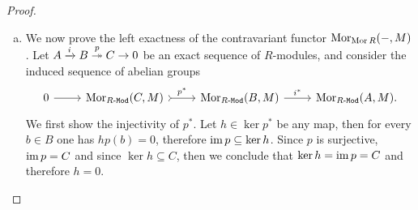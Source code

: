 \begin{proof}
\begin{enumerate}[(a)]
              For the converse of this inclusion, let \(h \in \ker g_{*}\) be any map so
              that \(g h(m) = 0\) for all \(m \in M\)---therefore \(h(m) \in \ker g\) and by
              exactness this means that there must exist \(a \in A\) such that \(f(a) = m\),
              which is unique since \(f\) is an injective map. Define \(p: M \to A\) by
              mapping \(m \mapsto a\) if \(h(m) = f(a)\). To check that \(p\) is a morphism
              of modules, let \(m, m' \in M\) be elements and let \(a, a' \in A\) be such
              that \(h(m) = f(a)\) and \(h(m') = f(a')\). Then since
              \[
                  h(m + m') = h(m) + h(m') = f(a) + f(a') = f(a + a'),
              \]
              then \(p(m + m') = a + a' = p(m) + p(m')\). If \(r \in R\) is any ring
              element, then one also has
              \[
                  h(m r) = h(m) r = f(a) r = f(a r),
              \]
              therefore \(p(m r) = a r = p(m) r\). Then we conclude that \(p \in
              \Hom_{\Mor{R}}(M, A)\) and therefore \(f_{*}(p) = h\), showing that \(h \in
              \im f_{*}\) and that \(\ker g_{*} \subseteq \im f_{*}\). This finishes the
              proof that \(\im f_{*} = \ker g_{*}\).

        \item We now prove the left exactness of the contravariant functor
              \(\operatorname{Mor}_{\operatorname{Mor}{R}}(-, M)\). Let \(A \xrightarrow i B \overset{p}{\twoheadrightarrow} C \to 0\)
              be an exact sequence of \(R\)-modules, and consider the induced sequence of
              abelian groups
              \[
                  \begin{tikzcd}
                      0 \ar[r] &\Hom_{\Mod{R}}(C, M) \ar[r, tail, "p^{*}"] &\Hom_{\Mod{R}}(B, M)
                      \ar[r, "i^{*}"] &\Hom_{\Mod{R}}(A, M).
                  \end{tikzcd}
              \]
              We first show the injectivity of \(p^{*}\). Let \(h \in \ker p^{*}\) be any
              map, then for every \(b \in B\) one has \(h p(b) = 0\), therefore
              \(\operatorname{im} p \subseteq \ker h\). Since \(p\) is surjective, \(\operatorname{im} p = C\) and since
              \(\ker h \subseteq C\), then we conclude that \(\ker h = \operatorname{im} p = C\) and
              therefore \(h = 0\).


\end{enumerate}
\end{proof}
